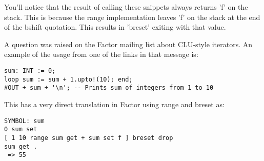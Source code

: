 You'll notice that the result of calling these snippets always returns
'f' on the stack. This is because the range implementation leaves 'f'
on the stack at the end of the bshift quotation. This results in
'breset' exiting with that value.

A question was raised on the Factor mailing list about CLU-style
iterators. An example of the usage from one of the links in that
message is:


\begin{verbatim}
sum: INT := 0;
loop sum := sum + 1.upto!(10); end;
#OUT + sum + '\n'; -- Prints sum of integers from 1 to 10
\end{verbatim}


This has a very direct translation in Factor using range and breset
as:


\begin{verbatim}
SYMBOL: sum
0 sum set 
[ 1 10 range sum get + sum set f ] breset drop
sum get .
 => 55
\end{verbatim}

